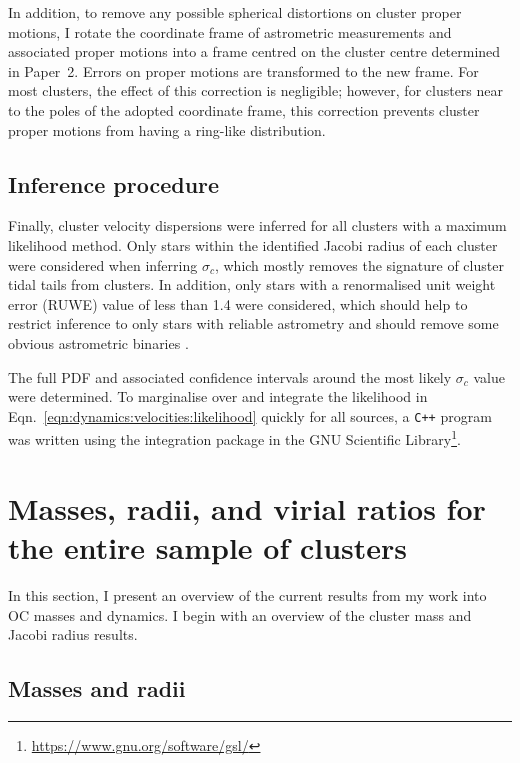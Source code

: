 In addition, to remove any possible spherical distortions on cluster proper motions, I rotate the coordinate frame of astrometric measurements and associated proper motions into a frame centred on the cluster centre determined in Paper~2. Errors on proper motions are transformed to the new frame. For most clusters, the effect of this correction is negligible; however, for clusters near to the poles of the adopted coordinate frame, this correction prevents cluster proper motions from having a ring-like distribution.

\subsection{Inference procedure}
\label{sec:dynamics:velocities:inference}

Finally, cluster velocity dispersions were inferred for all clusters with a maximum likelihood method. Only stars within the identified Jacobi radius of each cluster were considered when inferring $\sigma_c$, which mostly removes the signature of cluster tidal tails from clusters. In addition, only stars with a renormalised unit weight error (RUWE) value of less than 1.4 were considered, which should help to restrict inference to only stars with reliable astrometry and should remove some obvious astrometric binaries \citep{lindegren_gaia_2021,penoyre_astrometric_2022,penoyre_astrometric_2022-1}.

The full PDF and associated confidence intervals around the most likely $\sigma_c$ value were determined. To marginalise over and integrate the likelihood in Eqn.~\ref{eqn:dynamics:velocities:likelihood} quickly for all sources, a \texttt{C++} program was written using the integration package in the GNU Scientific Library\footnote{\url{https://www.gnu.org/software/gsl/}}.


\section{Masses, radii, and virial ratios for the entire sample of clusters}
\label{sec:dynamics:results}

In this section, I present an overview of the current results from my work into OC masses and dynamics. I begin with an overview of the cluster mass and Jacobi radius results.


\subsection{Masses and radii}
\label{sec:dynamics:results:masses}

